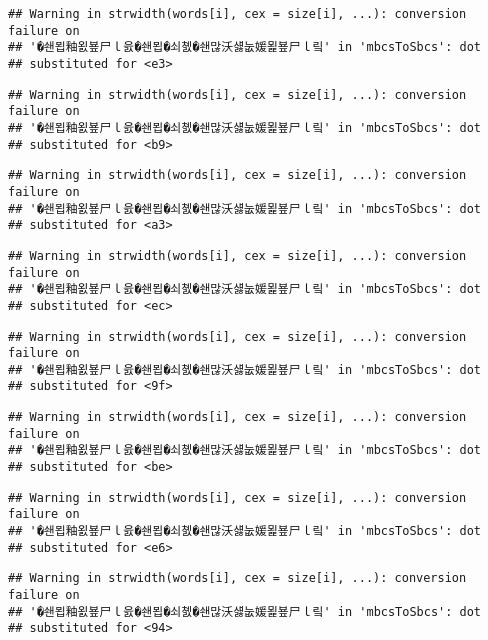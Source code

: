\documentclass[]{article}
\begin{document}
\begin{verbatim}
## Warning in strwidth(words[i], cex = size[i], ...): conversion failure on
## '�쇈묍釉욄뵾尸ｌ읈�쇈묍�쇠쳸�쇈많沃섏눖媛묉뵾尸ｌ맄' in 'mbcsToSbcs': dot
## substituted for <e3>
\end{verbatim}

\begin{verbatim}
## Warning in strwidth(words[i], cex = size[i], ...): conversion failure on
## '�쇈묍釉욄뵾尸ｌ읈�쇈묍�쇠쳸�쇈많沃섏눖媛묉뵾尸ｌ맄' in 'mbcsToSbcs': dot
## substituted for <b9>
\end{verbatim}

\begin{verbatim}
## Warning in strwidth(words[i], cex = size[i], ...): conversion failure on
## '�쇈묍釉욄뵾尸ｌ읈�쇈묍�쇠쳸�쇈많沃섏눖媛묉뵾尸ｌ맄' in 'mbcsToSbcs': dot
## substituted for <a3>
\end{verbatim}

\begin{verbatim}
## Warning in strwidth(words[i], cex = size[i], ...): conversion failure on
## '�쇈묍釉욄뵾尸ｌ읈�쇈묍�쇠쳸�쇈많沃섏눖媛묉뵾尸ｌ맄' in 'mbcsToSbcs': dot
## substituted for <ec>
\end{verbatim}

\begin{verbatim}
## Warning in strwidth(words[i], cex = size[i], ...): conversion failure on
## '�쇈묍釉욄뵾尸ｌ읈�쇈묍�쇠쳸�쇈많沃섏눖媛묉뵾尸ｌ맄' in 'mbcsToSbcs': dot
## substituted for <9f>
\end{verbatim}

\begin{verbatim}
## Warning in strwidth(words[i], cex = size[i], ...): conversion failure on
## '�쇈묍釉욄뵾尸ｌ읈�쇈묍�쇠쳸�쇈많沃섏눖媛묉뵾尸ｌ맄' in 'mbcsToSbcs': dot
## substituted for <be>
\end{verbatim}

\begin{verbatim}
## Warning in strwidth(words[i], cex = size[i], ...): conversion failure on
## '�쇈묍釉욄뵾尸ｌ읈�쇈묍�쇠쳸�쇈많沃섏눖媛묉뵾尸ｌ맄' in 'mbcsToSbcs': dot
## substituted for <e6>
\end{verbatim}

\begin{verbatim}
## Warning in strwidth(words[i], cex = size[i], ...): conversion failure on
## '�쇈묍釉욄뵾尸ｌ읈�쇈묍�쇠쳸�쇈많沃섏눖媛묉뵾尸ｌ맄' in 'mbcsToSbcs': dot
## substituted for <94>
\end{verbatim}
\end{document}

